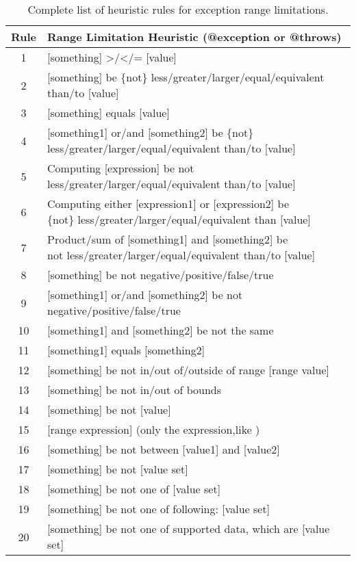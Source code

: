 \begin{table}[]
	\begin{tabular}{|c|l|}
		\hline
		\textbf{Rule} & \textbf{Range Limitation Heuristic (@exception or @throws)} \\ \hline
		1 & [something] >/</= [value] \\ \hline
		2 & [something] be \{not\} less/greater/larger/equal/equivalent than/to [value] \\ \hline
		3 & [something] equals [value] \\ \hline
		4 & \makecell{[something1] or/and [something2] be \{not\} \\ less/greater/larger/equal/equivalent than/to [value]} \\ \hline
		5 & \makecell{Computing [expression] be {not} \\ less/greater/larger/equal/equivalent than/to [value]} \\ \hline
		6 & \makecell{Computing either [expression1] or [expression2] be \\ \{not\} less/greater/larger/equal/equivalent than [value]} \\ \hline
		7 & \makecell{Product/sum of [something1] and [something2] be \\ {not} less/greater/larger/equal/equivalent than/to [value]} \\ \hline
		8 & [something] be {not} negative/positive/false/true \\ \hline
		9 & [something1] or/and [something2] be {not} negative/positive/false/true \\ \hline
		10 & [something1] and [something2] be {not} the same \\ \hline
		11 & [something1] equals [something2] \\ \hline
		12 & [something] be {not} in/out of/outside of range [range value] \\ \hline
		13 & [something] be {not} in/out of bounds \\ \hline
		14 & [something] be {not} [value] \\ \hline
		15 & [range expression] (only the expression,like ) \\ \hline
		16 & [something] be {not} between [value1] and [value2] \\ \hline
		17 & [something] be {not} [value set] \\ \hline
		18 & [something] be {not} one of [value set] \\ \hline
		19 & [something] be {not} one of following: [value set] \\ \hline
		20 & [something] be {not} one of supported data, which are [value set] \\ \hline
	\end{tabular}
	\caption{Complete list of heuristic rules for exception range limitations.}
	\label{tab:complete-heuristics-range-limit-except}
\end{table}

